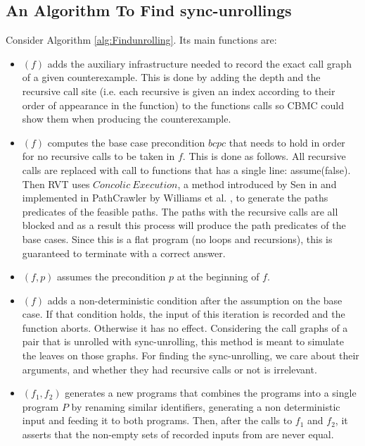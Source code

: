 \subsection{An Algorithm To Find sync-unrollings} \label{sec:findsyncunrolling}
Consider Algorithm \ref{alg:Findunrolling}. Its main functions are: 
\begin{itemize}
    \item {}$(f)$ adds the auxiliary infrastructure needed to record the exact call graph of a given counterexample. This is done by adding the depth and the recursive call site (i.e. each recursive is given an index according to their order of appearance in the function) to the functions calls so CBMC could show them when producing the counterexample.
    \item {}$(f)$ computes the base case precondition $bcpc$ that needs to hold in order for no recursive calls to be taken in $f$. This is done as follows. All recursive calls are replaced with call to  functions that has a single line: assume(false). Then RVT uses $Concolic\ Execution$, a method introduced by Sen in \cite{10.1145/1321631.1321746} and implemented in PathCrawler  by Williams et al. \cite{10.1007/11408901_21}, to generate the paths predicates of the feasible paths. The paths with the recursive calls are all blocked and as a result this process will produce the path predicates of the base cases. Since this is a flat program (no loops and recursions), this is guaranteed to terminate with a correct answer.
    \item {}$(f,p)$ assumes the precondition $p$ at the beginning of $f$. 
    \item {}$(f)$ adds a non-deterministic condition after the assumption on the base case. If that condition holds, the input of this iteration is recorded and the function aborts. Otherwise it has no effect. Considering the call graphs of a pair that is unrolled with sync-unrolling, this method is meant to simulate the leaves on those graphs. For finding the sync-unrolling, we care about their arguments, and whether they had recursive calls or not is irrelevant.
    \item {}$(f_1,f_2)$ generates a new programs that combines the programs into a single program $P$ by renaming similar identifiers, generating a non deterministic input and feeding it to both programs. Then, after the calls to $f_1$ and $f_2$, it asserts that the non-empty sets of recorded inputs from  are never equal.

\end{itemize}
